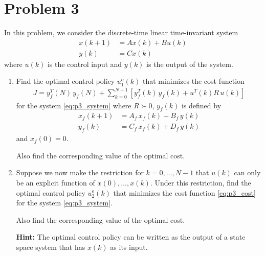 \section*{Problem 3}

In this problem, we consider the discrete-time linear time-invariant system
\begin{equation}
\begin{aligned}
    x(k+1) & = Ax(k) + Bu(k) \\
    y(k) & = Cx(k)
\end{aligned} \label{eq:p3_system}
\end{equation}
where $u(k)$ is the control input and $y(k)$ is the output of the system.

\begin{enumerate}
    \item
    Find the optimal control policy $u_1^o(k)$ that minimizes the cost function
    \begin{align}
        J = y_f^T(N) \, y_f(N) + \sum_{k=0}^{N-1} \left[ y_f^T(k) \, y_f(k) + u^T(k) R \, u(k) \right]
        \label{eq:p3_cost}
    \end{align}
    for the system \eqref{eq:p3_system} where $R \succ 0$, $y_f(k)$ is defined by
    \begin{align*}
        x_f(k+1) & = A_f \, x_f(k) + B_f \, y(k) \\
        y_f(k) & = C_f \, x_f(k) + D_f \, y(k)
    \end{align*}
    and $x_f(0) = 0$. 
    
    Also find the corresponding value of the optimal cost.
    
    \item
    Suppose we now make the restriction for $k=0,\ldots,N-1$ that $u(k)$ can only be an explicit function of $x(0),\ldots,x(k)$. Under this restriction, find the optimal control policy $u_2^o(k)$ that minimizes the cost function \eqref{eq:p3_cost} for the system \eqref{eq:p3_system}. 
    
    Also find the corresponding value of the optimal cost.
    
    \textbf{Hint: } The optimal control policy can be written as the output of a state space system that has $x(k)$ as its input.
    
    
\end{enumerate}

